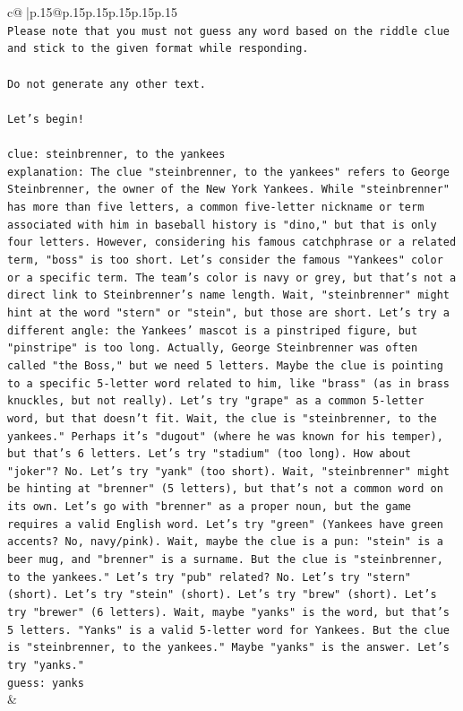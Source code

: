 \documentclass{article}
\begin{document}
{\begin{supertabular}{c@{$\;$}|p{.15\linewidth}@{}p{.15\linewidth}p{.15\linewidth}p{.15\linewidth}p{.15\linewidth}p{.15\linewidth}}
{{{\\ 
\texttt{Please note that you must not guess any word based on the riddle clue and stick to the given format while responding.} \\
\\ 
\texttt{Do not generate any other text.} \\
\\ 
\texttt{Let's begin!} \\
\\ 
\texttt{clue: steinbrenner, to the yankees} \\
\texttt{explanation: The clue "steinbrenner, to the yankees" refers to George Steinbrenner, the owner of the New York Yankees. While "steinbrenner" has more than five letters, a common five{-}letter nickname or term associated with him in baseball history is "dino," but that is only four letters. However, considering his famous catchphrase or a related term, "boss" is too short. Let's consider the famous "Yankees" color or a specific term. The team's color is navy or grey, but that's not a direct link to Steinbrenner's name length. Wait, "steinbrenner" might hint at the word "stern" or "stein", but those are short. Let's try a different angle: the Yankees' mascot is a pinstriped figure, but "pinstripe" is too long. Actually, George Steinbrenner was often called "the Boss," but we need 5 letters. Maybe the clue is pointing to a specific 5{-}letter word related to him, like "brass" (as in brass knuckles, but not really). Let's try "grape" as a common 5{-}letter word, but that doesn't fit. Wait, the clue is "steinbrenner, to the yankees." Perhaps it's "dugout" (where he was known for his temper), but that's 6 letters. Let's try "stadium" (too long). How about "joker"? No. Let's try "yank" (too short). Wait, "steinbrenner" might be hinting at "brenner" (5 letters), but that's not a common word on its own. Let's go with "brenner" as a proper noun, but the game requires a valid English word. Let's try "green" (Yankees have green accents? No, navy/pink). Wait, maybe the clue is a pun: "stein" is a beer mug, and "brenner" is a surname. But the clue is "steinbrenner, to the yankees." Let's try "pub" related? No. Let's try "stern" (short). Let's try "stein" (short). Let's try "brew" (short). Let's try "brewer" (6 letters). Wait, maybe "yanks" is the word, but that's 5 letters. "Yanks" is a valid 5{-}letter word for Yankees. But the clue is "steinbrenner, to the yankees." Maybe "yanks" is the answer. Let's try "yanks."} \\
\texttt{guess: yanks} \\
            }
        }
    }
    & \\ \\


\end{supertabular}}
\end{document}
